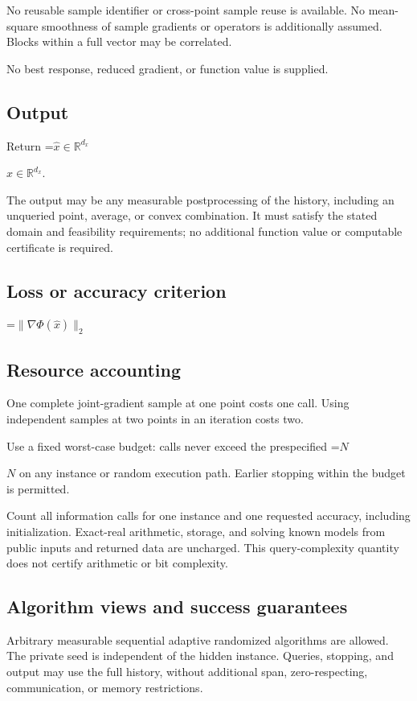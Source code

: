 \documentclass[10pt,a4paper]{article}
\newcommand{\AtlasMath}[1]{\par\begingroup\centering\setbox0=\hbox{$\displaystyle #1$}\ifdim\wd0>1.4\linewidth\typeout{ATLAS WIDE FORMULA: \the\wd0}\fi\ifdim\wd0>\linewidth\resizebox{\linewidth}{!}{\box0}\else\box0\fi\par\endgroup}
\newcommand{\AtlasInlineMath}[1]{\begingroup\setbox0=\hbox{$#1$}\ifdim\wd0>.4\linewidth\endgroup\AtlasMath{#1}\else\endgroup$#1$\fi}
\begin{document}
No reusable sample identifier or cross-point sample reuse is available. No mean-square smoothness of sample gradients or operators is additionally assumed. Blocks within a full vector may be correlated.

No best response, reduced gradient, or function value is supplied.

\subsection{Output}
Return \AtlasInlineMath{\widehat x\in\mathbb R^{d_x}}.

The output may be any measurable postprocessing of the history, including an unqueried point, average, or convex combination. It must satisfy the stated domain and feasibility requirements; no additional function value or computable certificate is required.

\subsection{Loss or accuracy criterion}

\AtlasMath{\|\nabla\Phi(\widehat{x})\|_2}


\subsection{Resource accounting}
One complete joint-gradient sample at one point costs one call. Using independent samples at two points in an iteration costs two.

Use a fixed worst-case budget: calls never exceed the prespecified \AtlasInlineMath{N} on any instance or random execution path. Earlier stopping within the budget is permitted.

Count all information calls for one instance and one requested accuracy, including initialization. Exact-real arithmetic, storage, and solving known models from public inputs and returned data are uncharged. This query-complexity quantity does not certify arithmetic or bit complexity.

\subsection{Algorithm views and success guarantees}
Arbitrary measurable sequential adaptive randomized algorithms are allowed. The private seed is independent of the hidden instance. Queries, stopping, and output may use the full history, without additional span, zero-respecting, communication, or memory restrictions.
\end{document}
